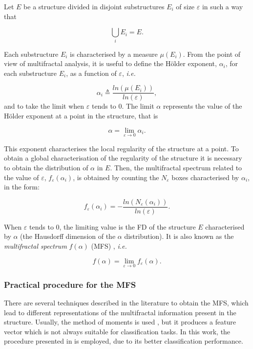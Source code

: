 \documentclass[twocolumn]{bmcart}%
\begin{document}
Let $E$ be a structure divided in disjoint substructures $E_{i}$ of size $\varepsilon$ in such a way that 

\begin{equation}
\displaystyle\bigcup_{i}E_{i} = E.
\end{equation}

Each substructure $E_{i}$ is characterised by a measure $\mu(E_{i})$. From the point of view of multifractal analysis, it is useful to define the H\"older exponent, $\alpha_{i}$, for each substructure $E_{i}$, as a function of $\varepsilon$, {\em i.e.}


\begin{equation}
\alpha_{i} \triangleq \frac{ln(\mu(E_{i}))}{ln(\varepsilon)},
\label{eqn:eqn4}
\end{equation}
\noindent
and to take the limit when $\varepsilon$ tends to $0$. The limit $\alpha$ represents the value of the H\"older exponent at a point in the structure, that is

\begin{equation}
\alpha = \lim_{\varepsilon\to0}{\alpha_{i}}.
\label{eqn:eqn5}
\end{equation}

This exponent characterises the local regularity of the structure at a point. To obtain a global characterisation of the regularity of the structure it is necessary to obtain the distribution of $\alpha$ in $E$. Then, the multifractal spectrum related to the value of $\varepsilon$, $f_{\varepsilon}(\alpha_{i})$, is obtained by counting the $N_{\varepsilon}$ boxes characterised by $\alpha_{i}$, in the form:

\begin{equation}
f_{\varepsilon}(\alpha_{i}) = - \frac{ln(N_{\varepsilon}(\alpha_{i}))}{ln(\varepsilon)}.
\label{eqn:eqn6}
\end{equation}

When $\varepsilon$ tends to $0$, the limiting value is the FD of the structure $E$ characterised by $\alpha$ (the Hausdorff dimension of the $\alpha$ distribution). It is also known as the {\em multifractal spectrum} $f(\alpha)$ (MFS) \cite{Silvetti2010}, {\em i.e.}

\begin{equation}
f(\alpha) = \lim_{\varepsilon\to0}{f_{\varepsilon}(\alpha)}.
\label{eqn:eqn7}
\end{equation}

\subsubsection{Practical procedure for the MFS}
There are several techniques described in the literature to obtain the MFS, which lead to different representations of the multifractal information present in the structure. Usually, the method of moments is used \cite{Mendoza2010,Serrano2012}, but it produces a feature vector which is not always suitable for classification tasks. In this work, the procedure presented in \cite{Xu2009} is employed, due to its better classification performance.
\end{document}

